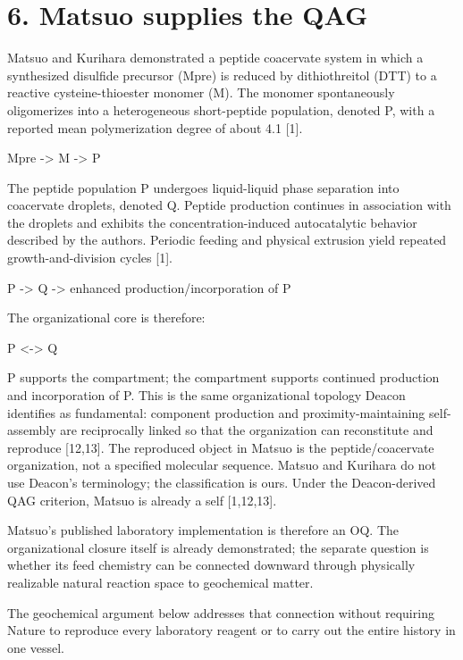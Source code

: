 \documentclass[11pt]{article}
\begin{document}
\hypertarget{matsuo-supplies-the-qag}{%
\section*{6. Matsuo supplies the QAG}\label{matsuo-supplies-the-qag}}

Matsuo and Kurihara demonstrated a peptide coacervate system in which a synthesized disulfide precursor (Mpre) is reduced by dithiothreitol (DTT) to a reactive cysteine-thioester monomer (M). The monomer spontaneously oligomerizes into a heterogeneous short-peptide population, denoted P, with a reported mean polymerization degree of about 4.1 {[}1{]}.

Mpre -\textgreater{} M -\textgreater{} P

The peptide population P undergoes liquid-liquid phase separation into coacervate droplets, denoted Q. Peptide production continues in association with the droplets and exhibits the concentration-induced autocatalytic behavior described by the authors. Periodic feeding and physical extrusion yield repeated growth-and-division cycles {[}1{]}.

P -\textgreater{} Q -\textgreater{} enhanced production/incorporation of P

The organizational core is therefore:

P \textless-\textgreater{} Q

P supports the compartment; the compartment supports continued production and incorporation of P. This is the same organizational topology Deacon identifies as fundamental: component production and proximity-maintaining self-assembly are reciprocally linked so that the organization can reconstitute and reproduce {[}12,13{]}. The reproduced object in Matsuo is the peptide/coacervate organization, not a specified molecular sequence. Matsuo and Kurihara do not use Deacon's terminology; the classification is ours. Under the Deacon-derived QAG criterion, Matsuo is already a self {[}1,12,13{]}.

Matsuo's published laboratory implementation is therefore an OQ. The organizational closure itself is already demonstrated; the separate question is whether its feed chemistry can be connected downward through physically realizable natural reaction space to geochemical matter.

The geochemical argument below addresses that connection without requiring Nature to reproduce every laboratory reagent or to carry out the entire history in one vessel.
\end{document}
